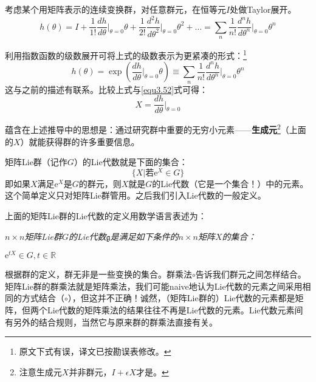考虑某个用矩阵表示的连续变换群，对任意群元，在恒等元$I$处做Taylor展开。
\begin{equation}
\label{equ3.53}
h(\theta) = I + \frac{1}{1!} \frac{dh}{d\theta} \bigg|_{\theta = 0} \theta +  \frac{1}{2!} \frac{d^2 h}{d \theta^2} \bigg|_{\theta = 0} \theta^2 + \dots = \sum_n \frac{1}{n!} \frac{d^n h}{d \theta^n} \bigg|_{\theta = 0} \theta^n
\end{equation}

利用指数函数的级数展开可将上式的级数表示为更紧凑的形式：\footnote{原文下式有误，译文已按勘误表修改。}
\begin{equation}
\label{equ3.54}
h(\theta) = \exp \left( \frac{dh}{d\theta}\Big|_{\theta = 0} \theta \right) \equiv \sum_n \frac{1}{n!} \frac{d^n h}{d \theta^n}\Bigg|_{\theta = 0} \theta^n
\end{equation}
这与之前的描述有联系。比较上式与\eqref{equ3.52}式可得：
\begin{equation}
\label{equ3.55}
X = \frac{dh}{d\theta}\Bigg|_{\theta = 0}
\end{equation}

蕴含在上述推导中的思想是：通过研究群中重要的无穷小元素——{\bfseries 生成元}\footnote{注意生成元$X$并非群元，$I + \epsilon X$才是。}（上面的$X$）就能获得群的许多重要信息。

矩阵Lie群（记作$G$）的Lie代数就是下面的集合：
\[
\Big\{X \Big| \text{若}\mathrm{e}^X \in G \Big\}
\]
即如果$X$满足$\mathrm{e}^X$是$G$的群元，则$X$就是$G$的Lie代数（它是一个集合！）中的元素。这个简单定义只对矩阵Lie群管用。之后我们引入Lie代数的一般定义。

上面的矩阵Lie群的Lie代数的定义用数学语言表述为：

{ \it
$n \times n$矩阵Lie群$G$的Lie代数$\mathfrak{g}$是满足如下条件的$n \times n$矩阵$X$的集合：

	{\begin{center}
		$\mathrm{e}^{tX} \in G, t \in \mathbb{R}$
	\end{center}
	}
}

根据群的定义，群无非是一些变换的集合。群乘法$\circ$告诉我们群元之间怎样结合。矩阵Lie群的群乘法就是矩阵乘法，我们可能naive地认为Lie代数的元素之间采用相同的方式结合（$\circ$），但这并不正确！诚然，（矩阵Lie群的）Lie代数的元素都是矩阵，但两个Lie代数的矩阵乘法的结果往往不再是Lie代数的元素。Lie代数元素间有另外的结合规则，当然它与原来群的群乘法直接有关。

